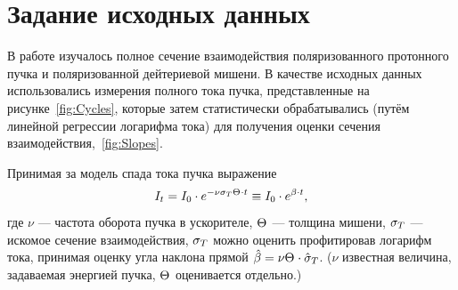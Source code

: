 \documentclass{article}
\begin{document}
	
	\singlespacing
	
	
	\tableofcontents 
	
	\onehalfspacing
	
	\section{Задание исходных данных}
	
	В работе изучалось полное сечение взаимодействия поляризованного протонного пучка и поляризованной дейтериевой мишени. В качестве исходных данных использовались измерения полного тока пучка, представленные на рисунке~\ref{fig:Cycles}, которые затем статистически обрабатывались (путём линейной регрессии логарифма тока) для получения оценки сечения взаимодействия,~\ref{fig:Slopes}. 
	
	Принимая за модель спада тока пучка выражение 
	\[
	I_t  = I_0 \cdot e^{-\nu\CS[T]\Thick \cdot t} \equiv I_0\cdot e^{\slp\cdot t},
	\]
	где $\nu$ --- частота оборота пучка в ускорителе, $\Thick$ --- толщина мишени, $\CS[T]$ --- искомое сечение взаимодействия, $\CS[T]$ можно оценить профитировав логарифм тока, принимая оценку угла наклона прямой $\slp* = \nu\Thick\cdot \CS*[T]$. ($\nu$ известная величина, задаваемая энергией пучка, $\Thick$ оценивается отдельно.)
	
\end{document}
